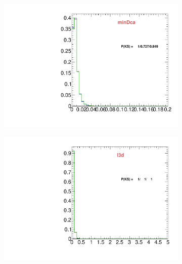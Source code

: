 \begin{figure}
\begin{subfigure}[b]{0.2\textwidth}
                \centering
                \includegraphics[width=\textwidth]{Figures/VariablesComparison/Data_barrel_figs_3h/minDca}
                \label{fig:Data_barrel_minDca_3h}
        \end{subfigure}
        \begin{subfigure}[b]{0.2\textwidth}
                \centering
                \includegraphics[width=\textwidth]{Figures/VariablesComparison/Data_barrel_figs_3h/l3d}
                \label{fig:Data_barrel_l3d_3h}
        \end{subfigure}
        \begin{subfigure}[b]{0.2\textwidth}
                \centering

\end{subfigure}
\end{figure}
